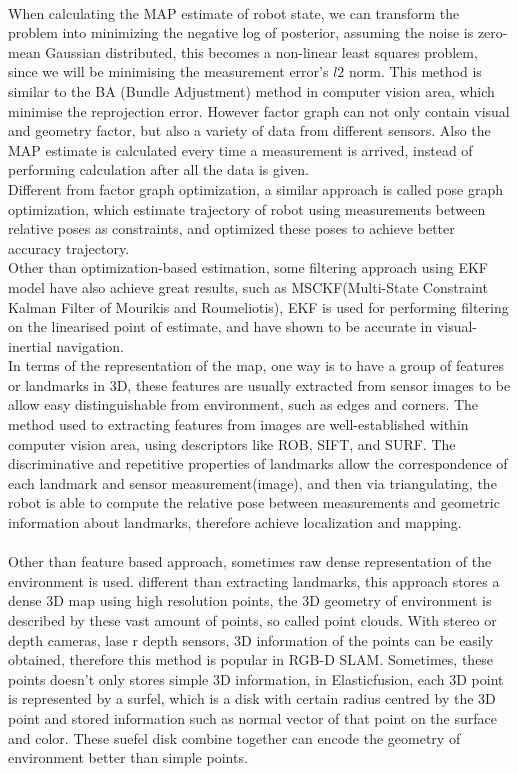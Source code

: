 \documentclass[12pt,twoside]{article}
\begin{document}
\\
When calculating the MAP estimate of robot state, we can transform the problem into minimizing the negative log of posterior, assuming the noise is zero-mean Gaussian distributed, this becomes a non-linear least squares problem, since we will be minimising the measurement error's $l2$ norm. This method is similar to the BA (Bundle Adjustment) method in computer vision area, which minimise the reprojection error. However factor graph can not only contain visual and geometry factor, but also a variety of data from different sensors. Also the MAP estimate is calculated every time a measurement is arrived, instead of performing calculation  after all the data is given.\\
Different from factor graph optimization, a similar approach is called pose graph optimization, which estimate trajectory of robot using measurements between relative poses as constraints, and optimized these poses to achieve better accuracy trajectory.
\\
Other than optimization-based estimation, some filtering approach using EKF model have also achieve great results, such as MSCKF(Multi-State Constraint Kalman Filter of Mourikis and Roumeliotis)\cite{mourikis2007multi}, EKF is used for performing filtering on the linearised point of estimate, and have shown to be accurate in visual-inertial navigation.
\\
In terms of the representation of the map, one way is to have a group of features or landmarks in 3D, these features are usually extracted from sensor images to be allow easy distinguishable from environment, such as edges and corners. The method used to extracting features from images are well-established within computer vision area, using descriptors like ROB, SIFT, and SURF. The discriminative and repetitive properties of landmarks allow the correspondence of each landmark and sensor measurement(image), and then via triangulating, the robot is able to compute the relative pose between measurements and geometric information about landmarks, therefore achieve localization and mapping.\\
\\
Other than feature based approach, sometimes raw dense representation of the environment is used. different than extracting landmarks, this approach stores a dense 3D map using high resolution points, the 3D geometry of environment is described by these vast amount of points, so called point clouds. With stereo or depth cameras, lase r depth sensors, 3D information of the points can be easily obtained, therefore this method is popular in RGB-D SLAM. Sometimes, these points doesn't only stores simple 3D information, in Elasticfusion\citep{whelan2015elasticfusion}, each 3D point is represented by a surfel, which is a disk with certain radius centred by the 3D point and stored information such as normal vector of that point on the surface and color. These suefel disk combine together can encode the geometry of environment better than simple points.\\
\end{document}

